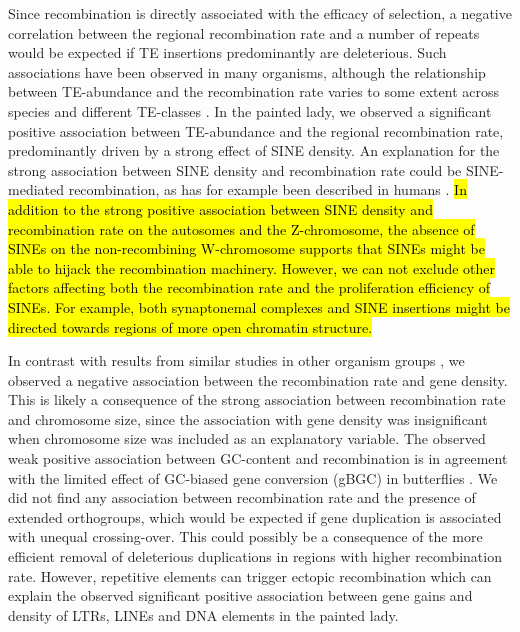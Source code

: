 \documentclass[twocolumn]{bmcart}%
\begin{document}
Since recombination is directly associated with the efficacy of selection, a negative correlation between the regional recombination rate and a number of repeats would be expected if TE insertions predominantly are deleterious. Such associations have been observed in many organisms, although the relationship between TE-abundance and the recombination rate varies to some extent across species and different TE-classes \cite{kentCoevolutionTransposableElements2017, rizzonRecombinationRateDistribution2002}. In the painted lady, we observed a significant positive association between TE-abundance and the regional recombination rate, predominantly driven by a strong effect of SINE density. An explanation for the strong association between SINE density and recombination rate could be SINE-mediated  recombination, as has for example been described in humans \cite{deiningerAluRepeatsHuman1999}. \hl{In addition to the strong positive association between SINE density and recombination rate on the autosomes and the Z-chromosome, the absence of SINEs on the non-recombining W-chromosome supports that SINEs might be able to hijack the recombination machinery. However, we can not exclude other factors affecting both the recombination rate and the proliferation efficiency of SINEs. For example, both synaptonemal complexes and SINE insertions might be directed towards regions of more open chromatin structure.}

In contrast with results from similar studies in other organism groups \cite{apuliInferringGenomicLandscape2020, kawakamiHighdensityLinkageMap2014}, we observed a negative association between the recombination rate and gene density. This is likely a consequence of the strong association between recombination rate and chromosome size, since the association with gene density was insignificant when chromosome size was included as an explanatory variable. The observed weak positive association between GC-content and recombination is in agreement with the limited effect of GC-biased gene conversion (gBGC) in butterflies \cite{bomanEffectsGCBiasedGene2021}. We did not find any association between recombination rate and the presence of extended orthogroups, which would be expected if gene duplication is associated with unequal crossing-over. This could possibly be a consequence of the more efficient removal of deleterious duplications in regions with higher recombination rate. However, repetitive elements can trigger ectopic recombination which can explain the observed significant positive association between gene gains and density of LTRs, LINEs and DNA elements in the painted lady.
\end{document}
